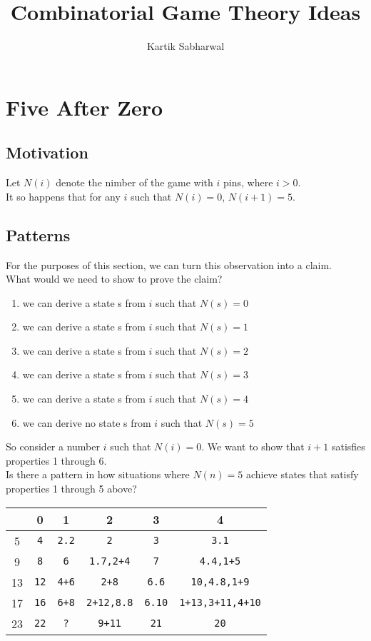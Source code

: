 \documentclass{article}
\title{Combinatorial Game Theory Ideas}
\author{Kartik Sabharwal}
\begin{document}
\maketitle
\section{Five After Zero}
\subsection{Motivation}
Let $N(i)$ denote the nimber of the game with $i$ pins, where $i > 0$. \\
It so happens that for any $i$ such that $N(i) = 0$, $N(i + 1) = 5$. \\
\subsection{Patterns}
For the purposes of this section, we can turn this observation into a claim. \\
What would we need to show to prove the claim?
\begin{enumerate}
  \item we can derive a state s from $i$ such that $N(s) = 0$
  \item we can derive a state s from $i$ such that $N(s) = 1$
  \item we can derive a state s from $i$ such that $N(s) = 2$
  \item we can derive a state s from $i$ such that $N(s) = 3$
  \item we can derive a state s from $i$ such that $N(s) = 4$
  \item we can derive no state s from $i$ such that $N(s) = 5$
\end{enumerate}
So consider a number $i$ such that $N(i) = 0$. We want to show that
$i+1$ satisfies properties 1 through 6. \\
Is there a pattern in how situations where $N(n) = 5$ achieve states
that satisfy properties 1 through 5 above?
\begin{center}
\begin{tabular}{c|c c c c c} 
    & 0 & 1 & 2 & 3 & 4 \\ 
 \hline
 5  & \verb|4|  & \verb|2.2| & \verb|2| & \verb|3| & \verb|3.1| \\ 
 9  & \verb|8|  & \verb|6| & \verb|1.7,2+4| & \verb|7| & \verb|4.4,1+5| \\ 
 13 & \verb|12| & \verb|4+6| & \verb|2+8| & \verb|6.6| & \verb|10,4.8,1+9| \\ 
 17 & \verb|16| & \verb|6+8| & \verb|2+12,8.8| & \verb|6.10| 
    & \verb|1+13,3+11,4+10| \\ 
 23 & \verb|22| & \verb|?| & \verb|9+11| & \verb|21| & \verb|20| \\ 
\end{tabular}
\end{center}
\end{document}
